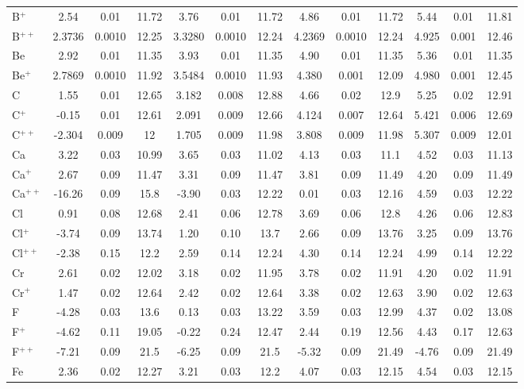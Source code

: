 \begin{longtable}{l!{\vrule width 0.25pt}ccc!{\vrule width 0.25pt}ccc!{\vrule width 0.25pt}ccc!{\vrule width 0.25pt}ccc}
B$^+$ & 2.54 & 0.01 & 11.72 & 3.76 & 0.01 & 11.72 & 4.86 & 0.01 & 11.72 & 5.44 & 0.01 & 11.81 \\
B$^{++}$ & 2.3736 & 0.0010 & 12.25 & 3.3280 & 0.0010 & 12.24 & 4.2369 & 0.0010 & 12.24 & 4.925 & 0.001 & 12.46 \\
Be & 2.92 & 0.01 & 11.35 & 3.93 & 0.01 & 11.35 & 4.90 & 0.01 & 11.35 & 5.36 & 0.01 & 11.35 \\
Be$^+$ & 2.7869 & 0.0010 & 11.92 & 3.5484 & 0.0010 & 11.93 & 4.380 & 0.001 & 12.09 & 4.980 & 0.001 & 12.45 \\
C & 1.55 & 0.01 & 12.65 & 3.182 & 0.008 & 12.88 & 4.66 & 0.02 & 12.9 & 5.25 & 0.02 & 12.91 \\
C$^+$ & -0.15 & 0.01 & 12.61 & 2.091 & 0.009 & 12.66 & 4.124 & 0.007 & 12.64 & 5.421 & 0.006 & 12.69 \\
C$^{++}$ & -2.304 & 0.009 & 12 & 1.705 & 0.009 & 11.98 & 3.808 & 0.009 & 11.98 & 5.307 & 0.009 & 12.01 \\
Ca & 3.22 & 0.03 & 10.99 & 3.65 & 0.03 & 11.02 & 4.13 & 0.03 & 11.1 & 4.52 & 0.03 & 11.13 \\
Ca$^+$ & 2.67 & 0.09 & 11.47 & 3.31 & 0.09 & 11.47 & 3.81 & 0.09 & 11.49 & 4.20 & 0.09 & 11.49 \\
Ca$^{++}$ & -16.26 & 0.09 & 15.8 & -3.90 & 0.03 & 12.22 & 0.01 & 0.03 & 12.16 & 4.59 & 0.03 & 12.22 \\
Cl & 0.91 & 0.08 & 12.68 & 2.41 & 0.06 & 12.78 & 3.69 & 0.06 & 12.8 & 4.26 & 0.06 & 12.83 \\
Cl$^+$ & -3.74 & 0.09 & 13.74 & 1.20 & 0.10 & 13.7 & 2.66 & 0.09 & 13.76 & 3.25 & 0.09 & 13.76 \\
Cl$^{++}$ & -2.38 & 0.15 & 12.2 & 2.59 & 0.14 & 12.24 & 4.30 & 0.14 & 12.24 & 4.99 & 0.14 & 12.22 \\
Cr & 2.61 & 0.02 & 12.02 & 3.18 & 0.02 & 11.95 & 3.78 & 0.02 & 11.91 & 4.20 & 0.02 & 11.91 \\
Cr$^+$ & 1.47 & 0.02 & 12.64 & 2.42 & 0.02 & 12.64 & 3.38 & 0.02 & 12.63 & 3.90 & 0.02 & 12.63 \\
F & -4.28 & 0.03 & 13.6 & 0.13 & 0.03 & 13.22 & 3.59 & 0.03 & 12.99 & 4.37 & 0.02 & 13.08 \\
F$^+$ & -4.62 & 0.11 & 19.05 & -0.22 & 0.24 & 12.47 & 2.44 & 0.19 & 12.56 & 4.43 & 0.17 & 12.63 \\
F$^{++}$ & -7.21 & 0.09 & 21.5 & -6.25 & 0.09 & 21.5 & -5.32 & 0.09 & 21.49 & -4.76 & 0.09 & 21.49 \\
Fe & 2.36 & 0.02 & 12.27 & 3.21 & 0.03 & 12.2 & 4.07 & 0.03 & 12.15 & 4.54 & 0.03 & 12.15 \\

\end{longtable}
